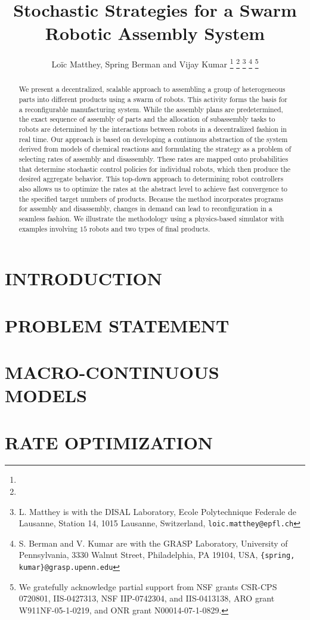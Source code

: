 \documentclass[a4paper, 10pt, conference]{ieeeconf}      %
\title{\LARGE \bf Stochastic Strategies for a Swarm Robotic Assembly System}
\author{Lo\"ic Matthey, Spring Berman and Vijay Kumar%
\thanks{}%
\thanks{
        {\tt\small }}%
\thanks{L. Matthey is with the DISAL Laboratory, Ecole Polytechnique Federale de Lausanne, Station 14, 1015 Lausanne, Switzerland,
{\tt\small loic.matthey@epfl.ch}}
\thanks{S. Berman and V. Kumar are with the GRASP Laboratory, University of Pennsylvania, 3330 Walnut Street, Philadelphia, PA 19104, USA,
        {\tt\small \{spring, kumar\}@grasp.upenn.edu}}
\thanks{We gratefully acknowledge partial support from NSF grants CSR-CPS
0720801, IIS-0427313, NSF IIP-0742304, and IIS-0413138, ARO grant
W911NF-05-1-0219, and ONR grant N00014-07-1-0829.} }
\begin{document}
\maketitle
\thispagestyle{empty}
\pagestyle{empty}


\begin{abstract}
We present a decentralized, scalable approach to assembling a group
of heterogeneous parts into different products using a swarm of
robots. This activity forms the basis for a reconfigurable
manufacturing system. While the assembly plans are predetermined,
the exact sequence of assembly of parts and the allocation of
subassembly tasks to robots are determined by the interactions
between robots in a decentralized fashion in real time. Our approach
is based on developing a continuous abstraction of the system
derived from models of chemical reactions and formulating the
strategy as a problem of selecting rates of assembly and
disassembly. These rates are mapped onto probabilities  that
determine stochastic control policies for individual robots, which
then produce the desired aggregate behavior. This top-down approach
to determining robot controllers also allows us to optimize the
rates at the abstract level to achieve fast convergence to the
specified target numbers of products. Because the method
incorporates programs for assembly and disassembly, changes in
demand can lead to reconfiguration in a seamless fashion. We
illustrate the methodology using a physics-based simulator with
examples involving $15$ robots and two types of final products.
\end{abstract}


\section{INTRODUCTION}
    

\section{PROBLEM STATEMENT}
    

\section{MACRO-CONTINUOUS MODELS}
    

\section{RATE OPTIMIZATION}\label{sec:optimization}
    
\end{document}
